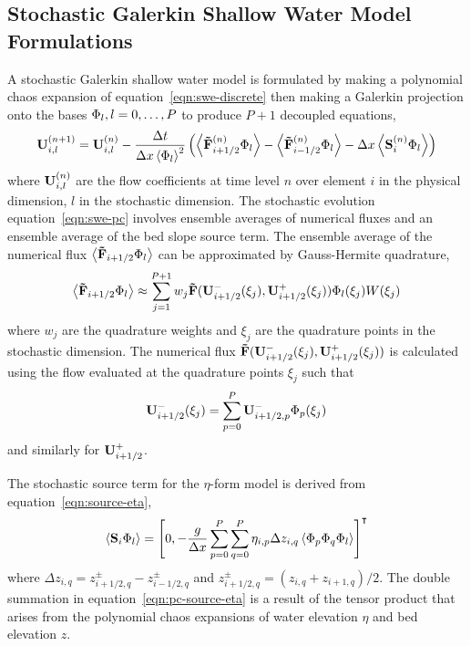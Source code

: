 \subsection{Stochastic Galerkin Shallow Water Model Formulations}
A stochastic Galerkin shallow water model is formulated by making a polynomial chaos expansion of equation~\eqref{eqn:swe-discrete} then making a Galerkin projection onto the bases $\Phi_l, l = 0, \ldots, P$ to produce $P + 1$ decoupled equations,
\begin{align}
    \mathbf{U}_{i,l}^{(n+1)} = \mathbf{U}_{i,l}^{(n)}
    - \frac{\Delta t}{\Delta x \left\langle \Phi_l \right\rangle^2}
    \left(
    \left\langle \mathbf{\tilde{F}}_{i+1/2}^{(n)} \Phi_l \right\rangle
    -
    \left\langle \mathbf{\tilde{F}}_{i-1/2}^{(n)} \Phi_l \right\rangle
    - \Delta x \left\langle \mathbf{S}_i^{(n)} \Phi_l \right\rangle
    \right) \label{eqn:swe-pc}
\end{align}
where $\mathbf{U}_{i,l}^{(n)}$ are the flow coefficients at time level $n$ over element $i$ in the physical dimension, $l$ in the stochastic dimension.
The stochastic evolution equation~\eqref{eqn:swe-pc} involves ensemble averages of numerical fluxes and an ensemble average of the bed slope source term.
The ensemble average of the numerical flux $\left\langle \mathbf{\tilde{F}}_{i+1/2} \Phi_l \right\rangle$ can be approximated by Gauss-Hermite quadrature,
\begin{align}
    \left\langle \mathbf{\tilde{F}}_{i+1/2} \Phi_l \right\rangle
    \approx
    \sum_{j=1}^{P+1} w_j
    \mathbf{\tilde{F}}( \mathbf{U}_{i+1/2}^-(\xi_j), \mathbf{U}_{i+1/2}^+(\xi_j) )
    \Phi_l(\xi_j) W(\xi_j)
\end{align}
where $w_j$ are the quadrature weights and $\xi_j$ are the quadrature points in the stochastic dimension.
The numerical flux $\mathbf{\tilde{F}}( \mathbf{U}_{i+1/2}^-(\xi_j), \mathbf{U}_{i+1/2}^+(\xi_j) )$ is calculated using the flow evaluated at the quadrature points $\xi_j$ such that
\begin{align}
    \mathbf{U}_{i+1/2}^-(\xi_j) = \sum_{p=0}^P \mathbf{U}_{i+1/2,p}^- \Phi_p(\xi_j)
\end{align}
and similarly for $\mathbf{U}_{i+1/2}^+$.

The stochastic source term for the $\eta$-form model is derived from equation~\eqref{eqn:source-eta},
\begin{align}
    \left\langle \mathbf{S}_i \Phi_l \right\rangle = \left[ 0,
    -\frac{g}{\Delta x} \sum_{p=0}^P \sum_{q=0}^P \eta_{i,p}
    \Delta z_{i,q}
    \left\langle \Phi_p \Phi_q \Phi_l \right\rangle
    \right]^\intercal \label{eqn:pc-source-eta}
\end{align}
where $\Delta z_{i,q} = z_{i+1/2,q}^\pm - z_{i-1/2,q}^\pm$ and $z_{i+1/2,q}^\pm = (z_{i,q}+z_{i+1,q})/2$.
The double summation in equation~\eqref{eqn:pc-source-eta} is a result of the tensor product that arises from the polynomial chaos expansions of water elevation $\eta$ and bed elevation $z$.


